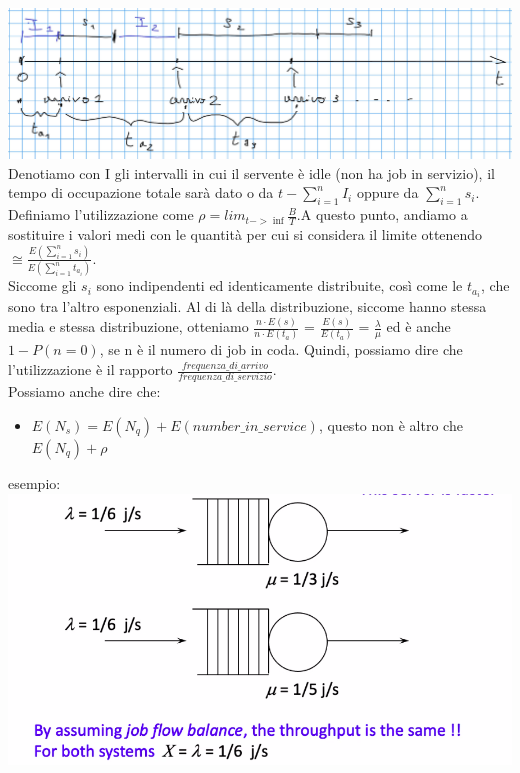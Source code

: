 \documentclass{article}
\begin{document}
\includegraphics[scale=0.3]{images/PMCSN-5.jpeg}\\
Denotiamo con I gli intervalli in cui il servente è idle (non ha job in servizio), il tempo di occupazione totale sarà dato o da $t - \sum\limits_{i = 1}^{n} I_i$ oppure da $\sum\limits_{i = 1}^{n} s_i$.\\ Definiamo l'utilizzazione come $\rho = lim_{t-> \inf} \frac{B}{T}$.A questo punto, andiamo a sostituire i valori medi con le quantità per cui si considera il limite ottenendo $\cong \frac{E(\sum\limits_{i = 1}^{n} s_i)}{E(\sum\limits_{i=1}^{n} t_{a_i})}$.\\ Siccome gli $s_i$ sono indipendenti ed identicamente distribuite, così come le $t_{a_i}$, che sono tra l'altro esponenziali. Al di là della distribuzione, siccome hanno stessa media e stessa distribuzione, otteniamo $\frac{n\cdot E(s)}{n\cdot E(t_a)}$ = $\frac{E(s)}{E(t_a)}$ = $\frac{\lambda}{\mu}$ ed è anche $1 - P(n = 0)$, se n è il numero di job in coda. Quindi, possiamo dire che l'utilizzazione è il rapporto $\frac{frequenza\_di\_arrivo}{frequenza\_di\_servizio}$.\\ Possiamo anche dire che:
\begin{itemize}
\item $E(N_s) = E(N_q) + E(number\_in\_service)$, questo non è altro che $E(N_q) + \rho$
\end{itemize}
esempio:\\ 
\includegraphics[scale=0.25]{images/PMCSN-6.png}
\end{document}
